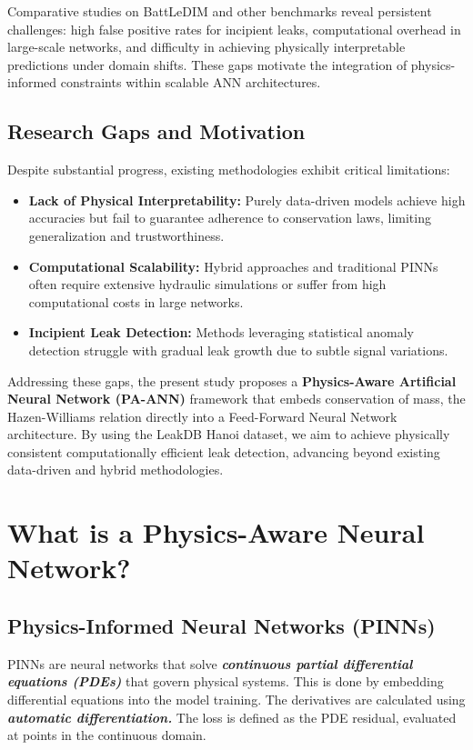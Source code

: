 \documentclass[final,5p,times,twocolumn,authoryear]{elsarticle}
\begin{document}
Comparative studies on BattLeDIM \cite{barros_leak_2025} and other benchmarks reveal persistent challenges: high false positive rates for incipient leaks, computational overhead in large-scale networks, and difficulty in achieving physically interpretable predictions under domain shifts. These gaps motivate the integration of physics-informed constraints within scalable ANN architectures.

\subsection{Research Gaps and Motivation}

Despite substantial progress, existing methodologies exhibit critical limitations:

\begin{itemize}
    \item \textbf{Lack of Physical Interpretability:} Purely data-driven models \cite{MAHDI2024100685, punukollu2023leakdetection} achieve high accuracies but fail to guarantee adherence to conservation laws, limiting generalization and trustworthiness.
    \item \textbf{Computational Scalability:} Hybrid approaches \cite{mazaev2022probabilisticleaklocalization} and traditional PINNs \cite{lin2025digitaltwin} often require extensive hydraulic simulations or suffer from high computational costs in large networks.
    \item \textbf{Incipient Leak Detection:} Methods leveraging statistical anomaly detection \cite{barros_leak_2025, TORNYEVIADZI2023106062} struggle with gradual leak growth due to subtle signal variations.
\end{itemize}

Addressing these gaps, the present study proposes a \textbf{Physics-Aware Artificial Neural Network (PA-ANN)} framework that embeds conservation of mass, the Hazen-Williams relation directly into a Feed-Forward Neural Network architecture. By using the LeakDB Hanoi dataset, we aim to achieve physically consistent computationally efficient leak detection, advancing beyond existing data-driven and hybrid methodologies.

\section{What is a Physics-Aware Neural Network?}

\subsection{Physics-Informed Neural Networks (PINNs)}
PINNs are neural networks that solve \textbf{\textit{continuous partial differential equations (PDEs)}} that govern physical systems. This is done by embedding differential equations into the model training. The derivatives are calculated using \textbf{\textit{automatic differentiation.}} The loss is defined as the PDE residual, evaluated at points in the continuous domain.
\end{document}
